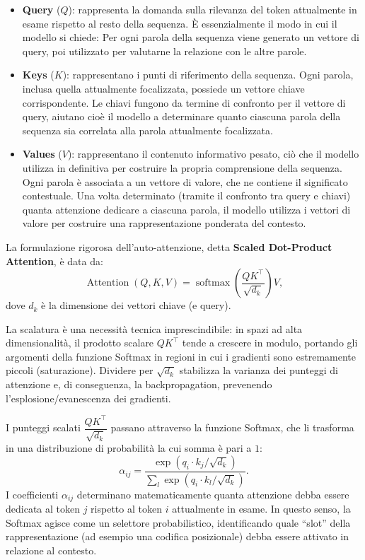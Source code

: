 \begin{itemize}
    \item \textbf{Query} ($Q$): rappresenta la domanda sulla rilevanza del token attualmente in esame rispetto al resto della sequenza. È essenzialmente il modo in cui il modello si chiede: Per ogni parola della sequenza viene generato un vettore di query, poi utilizzato per valutarne la relazione con le altre parole.

    \item \textbf{Keys} ($K$): rappresentano i punti di riferimento della sequenza. Ogni parola, inclusa quella attualmente focalizzata, possiede un vettore chiave corrispondente. Le chiavi fungono da termine di confronto per il vettore di query, aiutano cioè il modello a determinare quanto ciascuna parola della sequenza sia correlata alla parola attualmente focalizzata.

    \item \textbf{Values} ($V$): rappresentano il contenuto informativo pesato, ciò che il modello utilizza in definitiva per costruire la propria comprensione della sequenza. Ogni parola è associata a un vettore di valore, che ne contiene il significato contestuale. Una volta determinato (tramite il confronto tra query e chiavi) quanta attenzione dedicare a ciascuna parola, il modello utilizza i vettori di valore per costruire una rappresentazione ponderata del contesto.
\end{itemize}


La formulazione rigorosa dell'auto-attenzione, detta \textbf{Scaled Dot-Product Attention}, è data da:
\[
    \operatorname{Attention}(Q, K, V) = \operatorname{softmax}\!\left( \frac{Q K^{\top}}{\sqrt{d_k}} \right) V,
\]
dove $d_k$ è la dimensione dei vettori chiave (e query).

La scalatura è una necessità tecnica imprescindibile: in spazi ad alta dimensionalità, il prodotto scalare $Q K^{\top}$ tende a crescere in modulo, portando gli argomenti della funzione Softmax in regioni in cui i gradienti sono estremamente piccoli (saturazione). Dividere per $\sqrt{d_k}$ stabilizza la varianza dei punteggi di attenzione e, di conseguenza, la backpropagation, prevenendo l'esplosione/evanescenza dei gradienti.

I punteggi scalati $\dfrac{QK^{\top}}{\sqrt{d_k}}$ passano attraverso la funzione Softmax, che li trasforma in una distribuzione di probabilità la cui somma è pari a $1$:
\[
    \alpha_{ij} = \frac{\exp\!\left( q_i \cdot k_j / \sqrt{d_k} \right)}{\displaystyle\sum_{l} \exp\!\left( q_i \cdot k_l / \sqrt{d_k} \right)} .
\]
I coefficienti $\alpha_{ij}$ determinano matematicamente quanta attenzione debba essere dedicata al token $j$ rispetto al token $i$ attualmente in esame. In questo senso, la Softmax agisce come un selettore probabilistico, identificando quale ``slot'' della rappresentazione (ad esempio una codifica posizionale) debba essere attivato in relazione al contesto.

